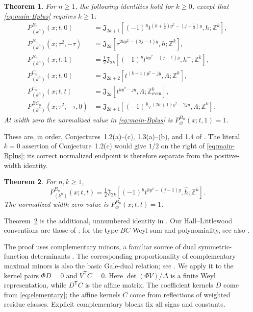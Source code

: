 \documentclass[12pt]{article}
\newtheorem{maintheorem}{Theorem}
\numberwithin{equation}{section}
\newcommand{\Z}{\mathbb Z}
\newcommand{\Jaff}{\mathfrak J}
\newcommand{\latticeeven}{\Z_{\mathrm{even}}^k}
\begin{document}
\begin{maintheorem}\label{thm:A}
For $n\ge1$, the following identities hold for $k\ge0$, except that
\eqref{eq:main-Bplus} requires $k\ge1$:
\begin{align}
 P_{(k^n)}^{B_n}(x;t,0)
 &=\Jaff_{2k+1}[(-1)^y t^{(k+\frac12)y^2-(j-\frac12)y},h;\Z^k],
 \label{eq:main-B0}\\
 P_{(k^n)}^{B_n}(x;\tau^2,-\tau)
 &=\Jaff_{2k}[\tau^{2ky^2-(2j-1)y},h;\Z^k],
 \label{eq:main-Bminus}\\
 P_{(k^n)}^{B_n}(x;t,1)
 &=\tfrac12\Jaff_{2k}[(-1)^y t^{ky^2-(j-1)y},h^+;\Z^k],
 \label{eq:main-Bplus}\\
 P_{(k^n)}^{C_n}(x;t,0)
 &=\Jaff_{2k+2}[t^{(k+1)y^2-jy},\Lambda;\Z^k],
 \label{eq:main-C0}\\
 P_{(k^n)}^{C_n}(x;t,t)
 &=\Jaff_{2k}[t^{ky^2-jy},\Lambda;\latticeeven],
 \label{eq:main-Ct}\\
 P_{(k^n)}^{BC_n}(x;\tau^2,-\tau,0)
 &=\Jaff_{2k+1}[(-1)^y\tau^{(2k+1)y^2-2jy},\Lambda;\Z^k].
 \label{eq:main-BC}
\end{align}
At width zero the normalized value in \eqref{eq:main-Bplus} is
$P_{\varnothing}^{B_n}(x;t,1)=1$.
\end{maintheorem}

These are, in order, Conjectures~1.2(a)--(c), 1.3(a)--(b), and 1.4 of
\cite{Warnaar2026}.  The literal $k=0$ assertion of Conjecture~1.2(c)
would give $1/2$ on the right of \eqref{eq:main-Bplus}; its correct
normalized endpoint is therefore separate from the positive-width
identity.

\begin{maintheorem}\label{thm:B}
For $n,k\ge1$,
\begin{equation}\label{eq:main-Bt}
 P_{(k^n)}^{B_n}(x;t,t)
 =\tfrac12\Jaff_{2k}[(-1)^y t^{ky^2-(j-1)y},\widehat h;\Z^k].
\end{equation}
The normalized width-zero value is $P_{\varnothing}^{B_n}(x;t,t)=1$.
\end{maintheorem}

Theorem~\ref{thm:B} is the additional, unnumbered identity in
\cite[Section~6]{Warnaar2026}.  Our Hall--Littlewood conventions are
those of \cite[(2.16)--(2.17)]{Warnaar2026}; for the type-$BC$ Weyl
sum and polynomiality, see also
\cite[Definition~2.4 and Theorems~2.5--2.6]{Venkateswaran2013}.

The proof uses complementary minors, a familiar source of dual
symmetric-function determinants \cite{Aitken1931,McDowell2023}.
The corresponding proportionality of complementary maximal minors is
also the basic Gale-dual relation; see
\cite[Lemma~2.10]{MullerEtAl2016}.  We apply it to the kernel pairs
$\Phi D=0$ and $V^{\mathsf T}C=0$.
Here $\det(\Phi V)/\Delta$ is a finite Weyl representation, while
$D^{\mathsf T}C$ is the affine matrix.  The coefficient kernels $D$
come from \eqref{eq:elementary}; the affine kernels $C$ come from
reflections of weighted residue classes.  Explicit complementary blocks
fix all signs and constants.
\end{document}
